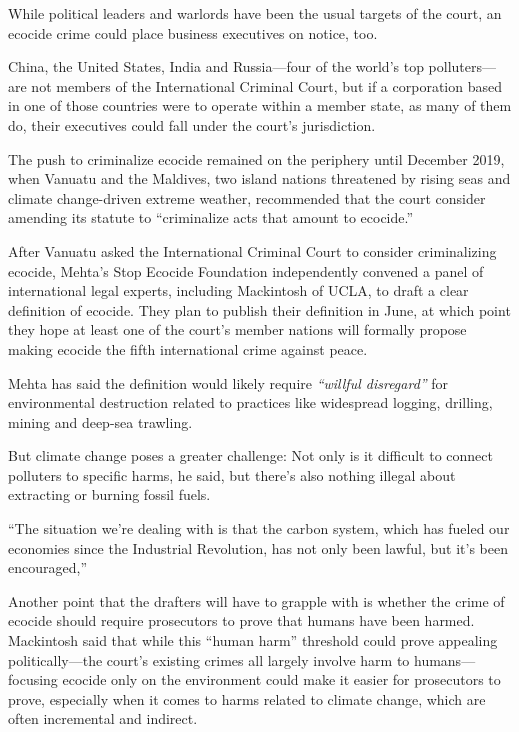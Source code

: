 \documentclass[
]{book}
\begin{document}
While political leaders and warlords have been the usual targets of the court, an ecocide crime could place business executives on notice, too.

China, the United States, India and Russia---four of the world's top polluters---are not members of the International Criminal Court, but if a corporation based in one of those countries were to operate within a member state, as many of them do, their executives could fall under the court's jurisdiction.

The push to criminalize ecocide remained on the periphery until December 2019, when Vanuatu and the Maldives, two island nations threatened by rising seas and climate change-driven extreme weather, recommended that the court consider amending its statute to ``criminalize acts that amount to ecocide.''

After Vanuatu asked the International Criminal Court to consider criminalizing ecocide, Mehta's Stop Ecocide Foundation independently convened a panel of international legal experts, including Mackintosh of UCLA, to draft a clear definition of ecocide. They plan to publish their definition in June, at which point they hope at least one of the court's member nations will formally propose making ecocide the fifth international crime against peace.

Mehta has said the definition would likely require \emph{``willful disregard''} for environmental destruction related to practices like widespread logging, drilling, mining and deep-sea trawling.

But climate change poses a greater challenge: Not only is it difficult to connect polluters to specific harms, he said, but there's also nothing illegal about extracting or burning fossil fuels.

``The situation we're dealing with is that the carbon system, which has fueled our economies since the Industrial Revolution, has not only been lawful, but it's been encouraged,''

Another point that the drafters will have to grapple with is whether the crime of ecocide should require prosecutors to prove that humans have been harmed. Mackintosh said that while this ``human harm'' threshold could prove appealing politically---the court's existing crimes all largely involve harm to humans---focusing ecocide only on the environment could make it easier for prosecutors to prove, especially when it comes to harms related to climate change, which are often incremental and indirect.
\end{document}
